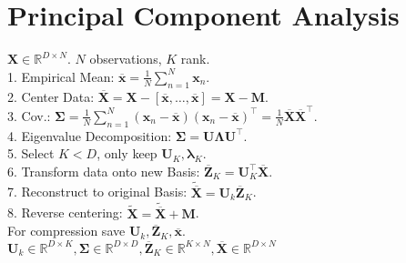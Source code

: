 \section*{Principal Component Analysis}
$\mathbf{X} \in \mathbb{R}^{D \times N}$. $N$ observations, $K$ rank.\\
1. Empirical Mean: $\overline{\mathbf{x}} = \frac{1}{N} \sum_{n=1}^N \mathbf{x}_n$.\\
2. Center Data: $\overline{\mathbf{X}} = \mathbf{X} - [\overline{\mathbf{x}}, \ldots, \overline{\mathbf{x}}] = \mathbf{X} - \mathbf{M}$.\\
3. Cov.: $\boldsymbol{\Sigma} = \frac{1}{N	} \sum_{n=1}^N (\mathbf{x}_n - \overline{\mathbf{x}}) (\mathbf{x}_n - \overline{\mathbf{x}})^\top = \frac{1}{N} \overline{\mathbf{X}}\overline{\mathbf{X}}^\top$.\\
4. Eigenvalue Decomposition: $\boldsymbol{\Sigma} = \mathbf{U} \boldsymbol{\Lambda} \mathbf{U}^\top$.\\
5. Select $K < D$, only keep $\mathbf{U}_K, \boldsymbol{\lambda}_K$.\\
6. Transform data onto new Basis: $\overline{\mathbf{Z}}_K = \mathbf{U}_K^\top \overline{\mathbf{X}}$.\\
7. Reconstruct to original Basis: $\tilde{\overline{\mathbf{X}}} = \mathbf{U}_k \overline{\mathbf{Z}}_K$.\\
8. Reverse centering: $\tilde{\mathbf{X}} = \tilde{\overline{\mathbf{X}}} + \mathbf{M}$.\\
For compression save $\mathbf{U}_k, \overline{\mathbf{Z}}_K, \overline{\mathbf{x}}$.\\
$\mathbf{U}_k \in \mathbb{R}^{D \times K}, \boldsymbol{\Sigma} \in \mathbb{R}^{D \times D}, \overline{\mathbf{Z}}_K \in \mathbb{R}^{K \times N}, \overline{\mathbf{X}} \in \mathbb{R}^{D \times N}$

